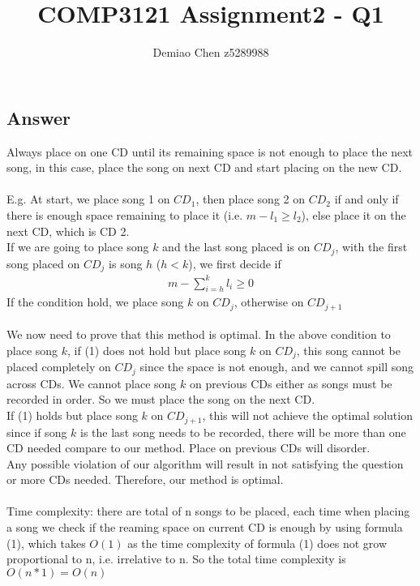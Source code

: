 \documentclass[12pt]{article}
\title{COMP3121 Assignment2 - Q1}
\author{Demiao Chen z5289988}
\begin{document}
\maketitle
{}

\subsection*{Answer}
Always place on one CD until its remaining space is not enough to place the next song,
in this case, place the song on next CD and start placing on the new CD. 
\\ 
\\ 
E.g. At start, we place song 1 on $CD_1$, then place song 2 on $CD_2$ if and only if 
there is enough space remaining
to place it (i.e. $m-l_1 \geqslant l_2$), else place it on the next CD, which is CD 2.\\
If we are going to place song $k$ and the last song placed is on $CD_j$, with the first song placed on $CD_j$ is song $h$ ($h < k$),
we first decide if 
\begin{align}\label{eq:1} 
    m-\sum_{i = h}^{k}{l_i} \geqslant 0
\end{align}
If the condition hold, we place song $k$ on $CD_j$, otherwise on $CD_{j+1}$\\\\
We now need to prove that this method is optimal. In the above condition
to place song $k$, if (1) does not hold but place song $k$ on $CD_j$, this song cannot 
be placed completely on $CD_j$ since the space is not enough, and we cannot spill song 
across CDs. We cannot place song $k$ on previous CDs either as songs must be recorded in order.
So we must place the song on the next CD.\\
If (1) holds but place song $k$ on $CD_{j+1}$, this will not achieve the optimal solution 
since if song $k$ is the last song needs to be recorded, there will be more than one
CD needed compare to our method. Place on previous CDs will disorder.\\
Any possible violation of our algorithm will result in not satisfying the question or more 
CDs needed. Therefore, our method is optimal.\\\\
Time complexity: there are total of n songs to be placed, each time when placing a song we check 
if the reaming space on current CD is enough by using formula (1), which takes $O(1)$ as the time complexity of
formula (1) does not grow proportional to n, i.e. irrelative to n. So the total time complexity is $O(n*1) = O(n)$
\end{document}
